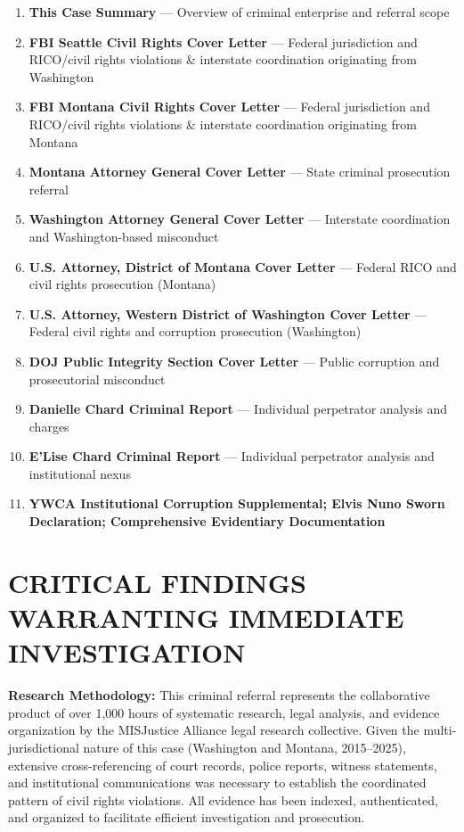 \documentclass[12pt,oneside]{article}
\begin{document}
\begin{enumerate}
\item \textbf{This Case Summary} --- Overview of criminal enterprise and referral scope
\item \textbf{FBI Seattle Civil Rights Cover Letter} --- Federal jurisdiction and RICO/civil rights violations \& interstate coordination originating from Washington
\item \textbf{FBI Montana Civil Rights Cover Letter} --- Federal jurisdiction and RICO/civil rights violations \& interstate coordination originating from Montana
\item \textbf{Montana Attorney General Cover Letter} --- State criminal prosecution referral
\item \textbf{Washington Attorney General Cover Letter} --- Interstate coordination and Washington-based misconduct
\item \textbf{U.S. Attorney, District of Montana Cover Letter} --- Federal RICO and civil rights prosecution (Montana)
\item \textbf{U.S. Attorney, Western District of Washington Cover Letter} --- Federal civil rights and corruption prosecution (Washington)
\item \textbf{DOJ Public Integrity Section Cover Letter} --- Public corruption and prosecutorial misconduct
\item \textbf{Danielle Chard Criminal Report} --- Individual perpetrator analysis and charges
\item \textbf{E'Lise Chard Criminal Report} --- Individual perpetrator analysis and institutional nexus
\item \textbf{YWCA Institutional Corruption Supplemental; Elvis Nuno Sworn Declaration; Comprehensive Evidentiary Documentation}
\end{enumerate}

\section*{CRITICAL FINDINGS WARRANTING IMMEDIATE INVESTIGATION}
\textbf{Research Methodology:} This criminal referral represents the collaborative product of over 1,000 hours of systematic research, legal analysis, and evidence organization by the MISJustice Alliance legal research collective. Given the multi-jurisdictional nature of this case (Washington and Montana, 2015--2025), extensive cross-referencing of court records, police reports, witness statements, and institutional communications was necessary to establish the coordinated pattern of civil rights violations. All evidence has been indexed, authenticated, and organized to facilitate efficient investigation and prosecution.
\end{document}
